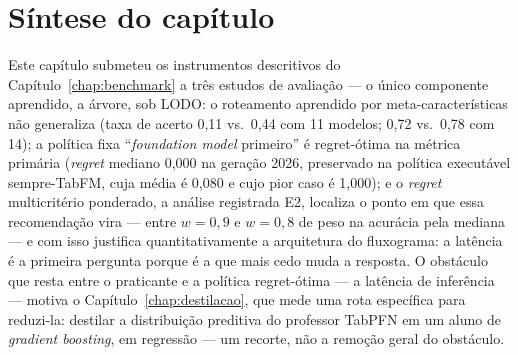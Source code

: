 \section{Síntese do capítulo}

Este capítulo submeteu os instrumentos descritivos do
Capítulo~\ref{chap:benchmark} a três estudos de avaliação --- o único
componente aprendido, a árvore, sob LODO: o roteamento aprendido por
meta-características não generaliza (taxa de acerto 0,11 vs.\ 0,44 com 11 modelos; 0,72 vs.\ 0,78 com
14); a política fixa ``\emph{foundation model} primeiro'' é regret-ótima na
métrica primária (\emph{regret} mediano 0,000 na geração 2026,
preservado na política executável sempre-TabFM, cuja média é 0,080 e
cujo pior caso é 1,000); e o \emph{regret}
multicritério ponderado, a análise registrada E2, localiza o
ponto em que essa recomendação vira --- entre $w{=}0{,}9$ e $w{=}0{,}8$
de peso na acurácia pela mediana --- e com isso justifica
quantitativamente a arquitetura do fluxograma: a latência é a primeira
pergunta porque é a que mais cedo muda a resposta. O obstáculo que resta entre o praticante e a política regret-ótima
--- a latência de inferência --- motiva o
Capítulo~\ref{chap:destilacao}, que mede uma rota específica para
reduzi-la: destilar a distribuição preditiva do professor TabPFN em um
aluno de \emph{gradient boosting}, em regressão --- um recorte, não a
remoção geral do obstáculo.
